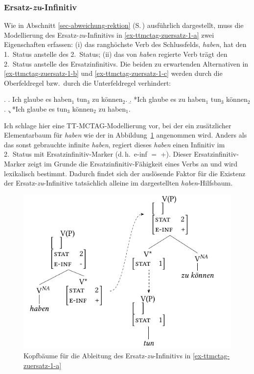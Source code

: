 \subsubsection{Ersatz-\emph{zu}-Infinitiv}

Wie in Abschnitt \ref{sec-abweichung-rektion} (S.\,\pageref{ex-kohaerenz-zuersatz-1}) ausführlich dargestellt, muss die Modellierung des Ersatz-\emph{zu}-Infinitivs in \ref{ex-ttmctag-zuersatz-1-a} zwei Eigenschaften erfassen: (i) das ranghöchste Verb des Schlussfelds, {\it haben}, hat den 1.~Status anstelle des 2.~Status; (ii) das von {\it haben} regierte Verb trägt den 2.~Status anstelle des Ersatzinfinitivs. Die beiden zu erwartenden Alternativen in \ref{ex-ttmctag-zuersatz-1-b} und \ref{ex-ttmctag-zuersatz-1-c} werden durch die Oberfeldregel bzw.\ durch die Unterfeldregel verhindert:

\ex. \label{ex-ttmctag-zuersatz-1}
\a. Ich glaube es haben$_1$ tun$_3$ zu können$_2$. \label{ex-ttmctag-zuersatz-1-a} 
\b. *Ich glaube es zu haben$_1$ tun$_3$ können$_2$. \label{ex-ttmctag-zuersatz-1-b}
\c. *Ich glaube es tun$_3$ können$_2$ zu haben$_1$. \label{ex-ttmctag-zuersatz-1-c}

Ich schlage hier eine TT-MCTAG-Modellierung vor, bei der ein zusätzlicher Elementarbaum für {\it haben} wie der in Abbildung~\ref{fig-ttmctag-ersatzzu} angenommen wird. Anders als das sonst gebrauchte infinite  {\it haben}, regiert dieses {\it haben} einen Infinitiv im 2.~Status mit Ersatzinfinitiv-Marker (d.\,h.\ {\sc e-inf} $=$ +). Dieser Ersatzinfinitiv-Marker zeigt im Grunde die Ersatzinfinitiv-Fähigkeit eines Verbs an und wird lexikalisch bestimmt. Dadurch findet sich der auslösende Faktor für die Existenz der Ersatz-\emph{zu}-Infinitive tatsächlich alleine im dargestellten {\it haben}-Hilfsbaum.

\begin{figure}[t]
\centering
\includegraphics{graphics/abb720.pdf}
\caption{\label{fig-ttmctag-ersatzzu}Kopfbäume für die Ableitung des Ersatz-\emph{zu}-Infinitivs in \ref{ex-ttmctag-zuersatz-1-a}}
\end{figure}

